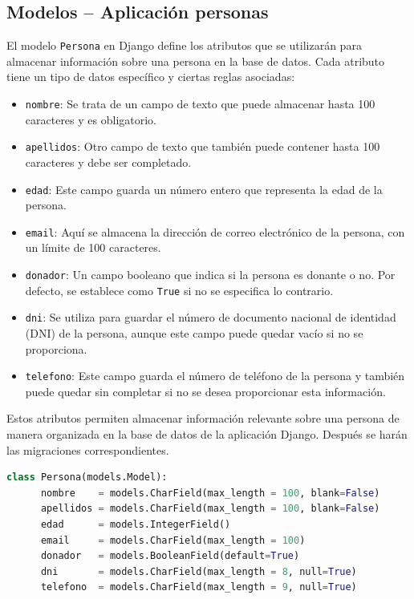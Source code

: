 \documentclass{article}
\begin{document}
  \subsection{Modelos -- Aplicación personas}
  El modelo \texttt{Persona} en Django define los atributos que se utilizarán para almacenar información sobre una persona en la base de datos. Cada atributo tiene un tipo de datos específico y ciertas reglas asociadas:
  \begin{itemize}
      \item \texttt{nombre}: Se trata de un campo de texto que puede almacenar hasta 100 caracteres y es obligatorio.
      \item \texttt{apellidos}: Otro campo de texto que también puede contener hasta 100 caracteres y debe ser completado.
      \item \texttt{edad}: Este campo guarda un número entero que representa la edad de la persona.
      \item \texttt{email}: Aquí se almacena la dirección de correo electrónico de la persona, con un límite de 100 caracteres.
      \item \texttt{donador}: Un campo booleano que indica si la persona es donante o no. Por defecto, se establece como \texttt{True} si no se especifica lo contrario.
      \item \texttt{dni}: Se utiliza para guardar el número de documento nacional de identidad (DNI) de la persona, aunque este campo puede quedar vacío si no se proporciona.
      \item \texttt{telefono}: Este campo guarda el número de teléfono de la persona y también puede quedar sin completar si no se desea proporcionar esta información.
  \end{itemize}
  Estos atributos permiten almacenar información relevante sobre una persona de manera organizada en la base de datos de la aplicación Django. Después se harán las migraciones 
  correspondientes.
  \begin{lstlisting}[language=Python, caption={Modelo Persona}]
    class Persona(models.Model):
      nombre    = models.CharField(max_length = 100, blank=False)
      apellidos = models.CharField(max_length = 100, blank=False)
      edad      = models.IntegerField()
      email     = models.CharField(max_length = 100)
      donador   = models.BooleanField(default=True)
      dni       = models.CharField(max_length = 8, null=True)
      telefono  = models.CharField(max_length = 9, null=True)
  \end{lstlisting}
  \newpage
\end{document}
